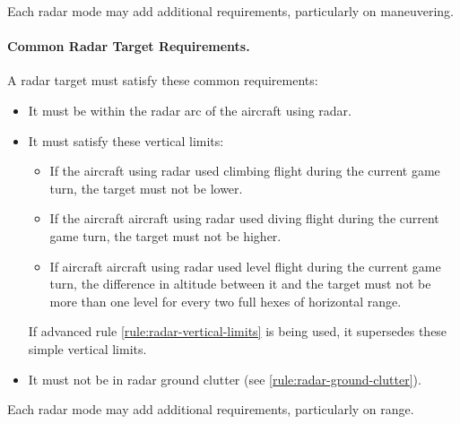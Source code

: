 {Each radar mode may add additional requirements, particularly on maneuvering.

\paragraph{Common Radar Target Requirements.}
\label{rule:common-radar-target-requirements}
A radar target must satisfy these common requirements:

    \begin{itemize}

    \item It must be within the radar arc of the aircraft using radar.

    \item It must satisfy these vertical limits:
    \begin{itemize}
        \item If the aircraft using radar used climbing flight during the current game turn, the target must not be lower.
        \item If the aircraft aircraft using radar used diving flight during the current game turn, the target must not be higher.
        \item If aircraft aircraft using radar used level flight during the current game turn, the difference in altitude between it and the target must not be more than one level for every two full hexes of horizontal range.
    \end{itemize}

    If advanced rule \ref{rule:radar-vertical-limits} is being used, it supersedes these simple vertical limits.

    \item It must not be in radar ground clutter (see  \ref{rule:radar-ground-clutter}).
    
\end{itemize}

Each radar mode may add additional requirements, particularly on range.

}

